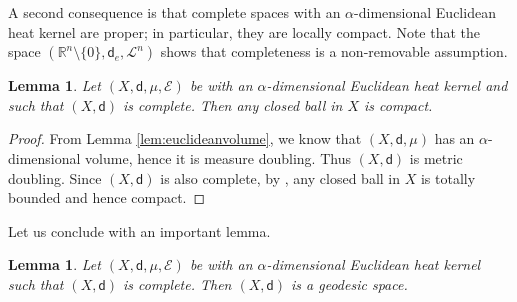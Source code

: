 \documentclass[10pt]{amsart}
\let\backslash\setminus
\theoremstyle{plain}
\newtheorem{lemma}[theorem]{Lemma}
\theoremstyle{definition}
\newcommand{\setR}{\mathbb{R}}
\newcommand{\cE}{\mathcal{E}}
\newcommand{\leb}{\mathscr{L}}
\newcommand{\dist}{\mathsf{d}}
\begin{document}
A second consequence is that complete spaces with an $\alpha$-dimensional Euclidean heat kernel are proper; in particular, they are locally compact. Note that the space $(\setR^n \backslash \{0\}, \dist_e,\leb^n)$ shows that completeness is a non-removable assumption.

\begin{lemma}
Let $(X,\dist,\mu,\cE)$ be with an $\alpha$-dimensional Euclidean heat kernel and such that $(X,\dist)$ is complete. Then any closed ball in $X$ is compact.
\end{lemma}

\begin{proof}
From Lemma \ref{lem:euclideanvolume}, we know that $(X,\dist,\mu)$ has an $\alpha$-dimensional volume, hence it is measure doubling. Thus $(X,\dist)$ is metric doubling. Since $(X,\dist)$ is also complete, by \cite[Exer.\,10.17]{Heinonen}, any closed ball in $X$ is totally bounded and hence compact.
\end{proof}

Let us conclude with an important lemma.

\begin{lemma}
Let $(X,\dist,\mu,\cE)$ be with an $\alpha$-dimensional Euclidean heat kernel such that $(X,\dist)$ is complete. Then $(X,\dist)$ is a geodesic space.
\end{lemma}
\end{document}
